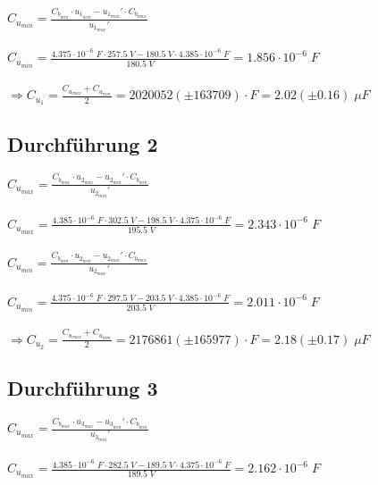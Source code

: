 \documentclass[a4paper,12pt]{article}
\begin{document}
$C_{u_{min}} = \displaystyle{\frac{C_{b_{min}}\cdot u_{1_{min}}-u_{1_{max}}'\cdot C_{b_{max}}}{u_{1_{max}}'}}$\\\\

$C_{u_{min}} = \displaystyle{\frac{4.375\cdot 10^{-6}\;F\cdot 257.5\;V-180.5\;V\cdot 4.385\cdot 10^{-6}\;F}{180.5\;V}} = 1.856\cdot 10^{-6}\;F$\\\\

$\Rightarrow C_{u_1}=\displaystyle{\frac{C_{u_{max}}+C_{u_{min}}}{2}} = 2020052 (\pm 163709)\cdot F = 2.02 (\pm 0.16)\; \mu F$

\subsection{Durchführung 2}

$C_{u_{max}} = \displaystyle{\frac{C_{b_{max}}\cdot u_{2_{max}}-u_{2_{min}}'\cdot C_{b_{min}}}{u_{2_{min}}'}}$\\\\

$C_{u_{max}} = \displaystyle{\frac{4.385\cdot 10^{-6}\;F\cdot 302.5\;V-198.5\;V\cdot 4.375\cdot 10^{-6}\;F}{195.5\;V}} = 2.343\cdot 10^{-6}\;F$\\\\

$C_{u_{min}} = \displaystyle{\frac{C_{b_{min}}\cdot u_{2_{min}}-u_{2_{max}}'\cdot C_{b_{max}}}{u_{2_{max}}'}}$\\\\

$C_{u_{min}} = \displaystyle{\frac{4.375\cdot 10^{-6}\;F\cdot 297.5\;V-203.5\;V\cdot 4.385\cdot 10^{-6}\;F}{203.5\;V}} = 2.011\cdot 10^{-6}\; F$\\\\

$\Rightarrow C_{u_2}=\displaystyle{\frac{C_{u_{max}}+C_{u_{min}}}{2}} = 2176861 (\pm 165977)\cdot F = 2.18 (\pm 0.17)\; \mu F$

\newpage
\subsection{Durchführung 3}

$C_{u_{max}} = \displaystyle{\frac{C_{b_{max}}\cdot u_{3_{max}}-u_{3_{min}}'\cdot C_{b_{min}}}{u_{3_{min}}'}}$\\\\

$C_{u_{max}} = \displaystyle{\frac{4.385\cdot 10^{-6}\;F\cdot 282.5\;V-189.5\;V\cdot 4.375\cdot 10^{-6}\;F}{189.5\;V}} = 2.162\cdot 10^{-6}\; F$\\\\
\end{document}
